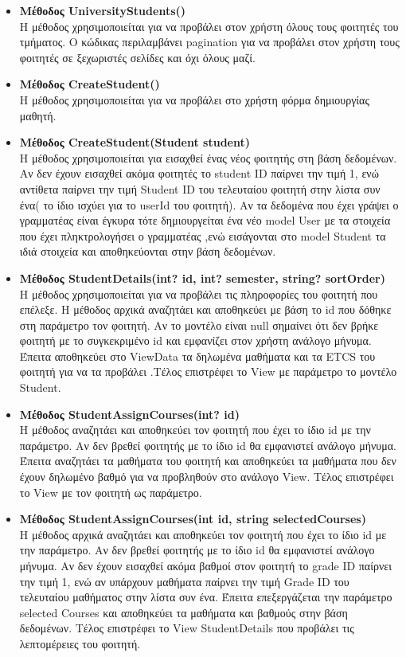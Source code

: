 \documentclass[12pt]{article}
\begin{document}
\begin{itemize}
	\item \textbf{Μέθοδος UniversityStudents()}\\
	Η μέθοδος χρησιμοποιείται για να προβάλει στον χρήστη όλους τους φοιτητές του τμήματος. Ο κώδικας περιλαμβάνει pagination για να προβάλει στον χρήστη τους φοιτητές σε ξεχωριστές σελίδες και όχι όλους μαζί. 
	
	\item \textbf{Μέθοδος CreateStudent()}\\
	Η μέθοδος χρησιμοποιείται για να προβάλει στο χρήστη φόρμα δημιουργίας μαθητή.
						
	\item \textbf{Μέθοδος CreateStudent(Student student)}\\
	Η μέθοδος χρησιμοποιείται για εισαχθεί ένας νέος φοιτητής στη βάση δεδομένων. Αν δεν έχουν εισαχθεί ακόμα φοιτητές το  student ID παίρνει την τιμή 1, ενώ αντίθετα παίρνει την τιμή Student ID του τελευταίου φοιτητή στην λίστα συν ένα( το ίδιο ισχύει για το userId του φοιτητή). Αν τα δεδομένα που έχει γράψει ο γραμματέας είναι έγκυρα τότε δημιουργείται ένα νέο model User με τα στοιχεία που έχει πληκτρολογήσει ο γραμματέας ,ενώ εισάγονται στο model Student τα ιδιά στοιχεία και αποθηκεύονται στην βάση δεδομένων.
	
	\item \textbf{Μέθοδος StudentDetails(int? id, int? semester, string? sortOrder)}\\
	Η μέθοδος χρησιμοποιείται για να προβάλει τις πληροφορίες του φοιτητή που επέλεξε. Η μέθοδος αρχικά αναζητάει και αποθηκεύει με βάση το id που δόθηκε στη παράμετρο τον φοιτητή. Αν το μοντέλο είναι null σημαίνει ότι δεν βρήκε φοιτητή με το συγκεκριμένο id και εμφανίζει στον χρήστη ανάλογο μήνυμα. Έπειτα αποθηκεύει στο ViewData τα δηλωμένα μαθήματα και τα ETCS του φοιτητή για να τα προβάλει .Τέλος επιστρέφει το View με παράμετρο το μοντέλο Student.
		
	\item \textbf{Μέθοδος StudentAssignCourses(int? id)}\\
	Η μέθοδος αναζητάει και αποθηκεύει τον φοιτητή που έχει το ίδιο id με την παράμετρο. Αν δεν βρεθεί φοιτητής με το ίδιο id θα εμφανιστεί ανάλογο μήνυμα. Έπειτα αναζητάει τα μαθήματα του φοιτητή και αποθηκεύει τα μαθήματα που δεν έχουν δηλωμένο βαθμό για να προβληθούν στο ανάλογο View. Τέλος επιστρέφει το View με τον φοιτητή ως παράμετρο.
			
	\item \textbf{Μέθοδος StudentAssignCourses(int id, string selectedCourses)}\\
	Η μέθοδος αρχικά αναζητάει και αποθηκεύει τον φοιτητή που έχει το ίδιο id με την παράμετρο. Αν δεν βρεθεί φοιτητής με το ίδιο id θα εμφανιστεί ανάλογο μήνυμα. Αν δεν έχουν εισαχθεί ακόμα βαθμοί στον φοιτητή το  grade ID παίρνει την τιμή 1, ενώ αν υπάρχουν μαθήματα παίρνει την τιμή Grade ID του τελευταίου μαθήματος στην λίστα συν ένα. Έπειτα επεξεργάζεται την παράμετρο selected Courses και αποθηκεύει τα μαθήματα και βαθμούς στην βάση δεδομένων. Τέλος επιστρέφει το View StudentDetails που προβάλει τις λεπτομέρειες του φοιτητή.
	

\end{itemize}
\end{document}

